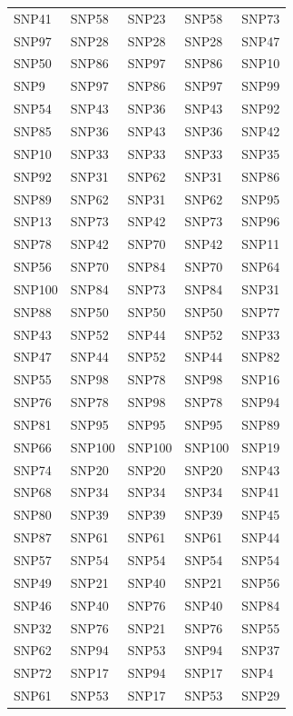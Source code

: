 \begin{table}[ht]
\begin{tabular}{lllll}
  SNP41 & SNP58 & SNP23 & SNP58 & SNP73 \\ 
  SNP97 & SNP28 & SNP28 & SNP28 & SNP47 \\ 
  SNP50 & SNP86 & SNP97 & SNP86 & SNP10 \\ 
  SNP9 & SNP97 & SNP86 & SNP97 & SNP99 \\ 
  SNP54 & SNP43 & SNP36 & SNP43 & SNP92 \\ 
  SNP85 & SNP36 & SNP43 & SNP36 & SNP42 \\ 
  SNP10 & SNP33 & SNP33 & SNP33 & SNP35 \\ 
  SNP92 & SNP31 & SNP62 & SNP31 & SNP86 \\ 
  SNP89 & SNP62 & SNP31 & SNP62 & SNP95 \\ 
  SNP13 & SNP73 & SNP42 & SNP73 & SNP96 \\ 
  SNP78 & SNP42 & SNP70 & SNP42 & SNP11 \\ 
  SNP56 & SNP70 & SNP84 & SNP70 & SNP64 \\ 
  SNP100 & SNP84 & SNP73 & SNP84 & SNP31 \\ 
  SNP88 & SNP50 & SNP50 & SNP50 & SNP77 \\ 
  SNP43 & SNP52 & SNP44 & SNP52 & SNP33 \\ 
  SNP47 & SNP44 & SNP52 & SNP44 & SNP82 \\ 
  SNP55 & SNP98 & SNP78 & SNP98 & SNP16 \\ 
  SNP76 & SNP78 & SNP98 & SNP78 & SNP94 \\ 
  SNP81 & SNP95 & SNP95 & SNP95 & SNP89 \\ 
  SNP66 & SNP100 & SNP100 & SNP100 & SNP19 \\ 
  SNP74 & SNP20 & SNP20 & SNP20 & SNP43 \\ 
  SNP68 & SNP34 & SNP34 & SNP34 & SNP41 \\ 
  SNP80 & SNP39 & SNP39 & SNP39 & SNP45 \\ 
  SNP87 & SNP61 & SNP61 & SNP61 & SNP44 \\ 
  SNP57 & SNP54 & SNP54 & SNP54 & SNP54 \\ 
  SNP49 & SNP21 & SNP40 & SNP21 & SNP56 \\ 
  SNP46 & SNP40 & SNP76 & SNP40 & SNP84 \\ 
  SNP32 & SNP76 & SNP21 & SNP76 & SNP55 \\ 
  SNP62 & SNP94 & SNP53 & SNP94 & SNP37 \\ 
  SNP72 & SNP17 & SNP94 & SNP17 & SNP4 \\ 
  SNP61 & SNP53 & SNP17 & SNP53 & SNP29 \\ 

\end{tabular}
\end{table}
